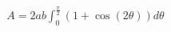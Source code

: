 \documentclass[preview]{standalone}
\begin{document}
\begin{align*}
A = 2ab \int_0^{\frac{\pi}{2}} \left( 1 + \cos(2\theta) \right) d\theta
\end{align*}
\end{document}

